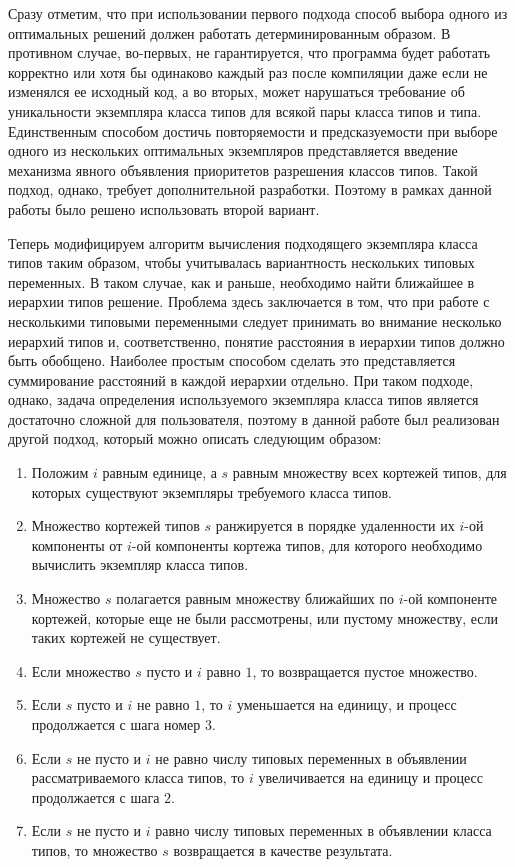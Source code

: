 Сразу отметим, что при использовании первого подхода способ выбора одного из оптимальных решений должен работать детерминированным образом. В противном случае, во-первых, не гарантируется, что программа будет работать корректно или хотя бы одинаково каждый раз после компиляции даже если не изменялся ее исходный код, а во вторых, может нарушаться требование об уникальности экземпляра класса типов для всякой пары класса типов и типа. Единственным способом достичь повторяемости и предсказуемости при выборе одного из нескольких оптимальных экземпляров представляется введение механизма явного объявления приоритетов разрешения классов типов. Такой подход, однако, требует дополнительной разработки. Поэтому в рамках данной работы было решено использовать второй вариант. 

Теперь модифицируем алгоритм вычисления подходящего экземпляра класса типов таким образом, чтобы учитывалась вариантность нескольких типовых переменных. В таком случае, как и раньше, необходимо найти ближайшее в иерархии типов решение. Проблема здесь заключается в том, что при работе с несколькими типовыми переменными следует принимать во внимание несколько иерархий типов и, соответственно, понятие расстояния в иерархии типов должно быть обобщено. Наиболее простым способом сделать это представляется суммирование расстояний в каждой иерархии отдельно. При таком подходе, однако, задача определения используемого экземпляра класса типов является достаточно сложной для пользователя, поэтому в данной работе был реализован другой подход, который можно описать следующим образом:
\begin{enumerate}
    \item Положим $i$ равным единице, а $s$ равным множеству всех кортежей типов, для которых существуют экземпляры требуемого класса типов.
    \item Множество кортежей типов $s$ ранжируется в порядке удаленности их $i$-ой компоненты от $i$-ой компоненты кортежа типов, для которого необходимо вычислить экземпляр класса типов.
    \item Множество $s$ полагается равным множеству ближайших по $i$-ой компоненте кортежей, которые еще не были рассмотрены, или пустому множеству, если таких кортежей не существует.
    \item Если множество $s$ пусто и $i$ равно $1$, то возвращается пустое множество. 
    \item Если $s$ пусто и $i$ не равно $1$, то $i$ уменьшается на единицу, и процесс продолжается с шага номер $3$. 
    \item Если $s$ не пусто и $i$ не равно числу типовых переменных в объявлении рассматриваемого класса типов, то $i$ увеличивается на единицу и процесс продолжается с шага $2$.
    \item Если $s$ не пусто и $i$ равно числу типовых переменных в объявлении класса типов, то множество $s$ возвращается в качестве результата. 
\end{enumerate}
